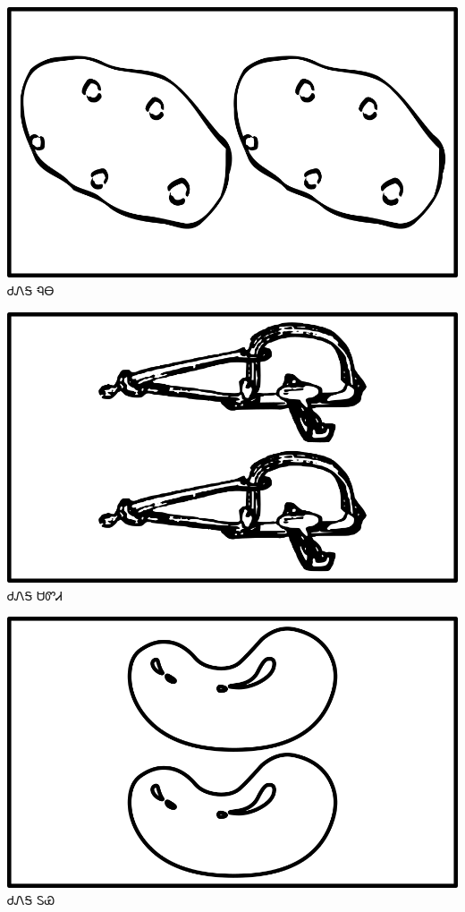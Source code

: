 \documentclass[avery5371]{flashcards}%
\begin{document}
\begin{flashcard}{
\includegraphics[width=0.95\columnwidth,height=.51\columnwidth,keepaspectratio]{../artwork/objects-neutral/tali-nuna}
}\Huge ᏧᏁᎦ ᏄᎾ
\end{flashcard}

\begin{flashcard}{
\includegraphics[width=0.95\columnwidth,height=.51\columnwidth,keepaspectratio]{../artwork/objects-neutral/tali-sadvdi}
}\Huge ᏧᏁᎦ ᏌᏛᏗ
\end{flashcard}

\begin{flashcard}{
\includegraphics[width=0.95\columnwidth,height=.51\columnwidth,keepaspectratio]{../artwork/objects-neutral/tali-tuya}
}\Huge ᏧᏁᎦ ᏚᏯ
\end{flashcard}
\end{document}
